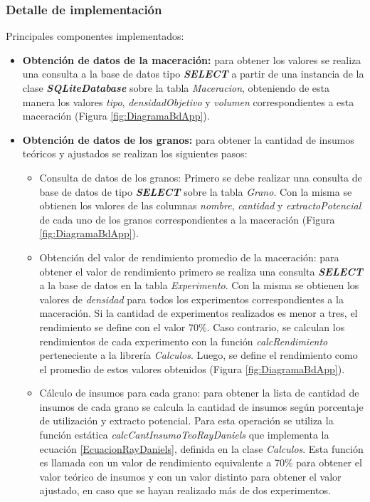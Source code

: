             \subsubsection{Detalle de implementación}
            \par Principales componentes implementados:
            \begin{itemize}
                \item \textbf{Obtención de datos de la maceración:} para obtener los valores se realiza una consulta a la base de datos tipo \textbf{ \textit{\gls{SELECT}}} a partir de una instancia de la clase \textbf{\textit{\gls{SQLiteDatabase}}} sobre la tabla \textit{Maceracion}, obteniendo de esta manera los valores \textit{tipo}, \textit{densidadObjetivo} y \textit{volumen} correspondientes a esta maceración (Figura \ref{fig:DiagramaBdApp}). 
                
                \item \textbf{Obtención de datos de los granos:} 
                    para obtener la cantidad de insumos teóricos y ajustados se realizan los siguientes pasos:
                    \begin{itemize}
                        \item Consulta de datos de los granos: Primero se debe realizar una consulta de base de datos de tipo \textbf{\textit{\gls{SELECT}}} sobre la tabla \textit{Grano}. Con la misma se obtienen los valores de las columnas \textit{nombre}, \textit{cantidad} y \textit{extractoPotencial} de cada uno de los granos correspondientes a la maceración (Figura \ref{fig:DiagramaBdApp}).
                        
                        \item Obtención del valor de rendimiento promedio de la maceración: para obtener el valor de rendimiento primero se realiza una consulta \textbf{\textit{\gls{SELECT}}} a la base de datos en la tabla \textit{Experimento}. Con la misma se obtienen los valores de \textit{densidad} para todos los experimentos correspondientes a la maceración. Si la cantidad de experimentos realizados es menor a tres, el rendimiento se define con el valor 70\%. Caso contrario, se calculan los rendimientos de cada experimento con la función \textit{calcRendimiento} perteneciente a la librería \textit{Calculos}. Luego, se define el rendimiento como el promedio de estos valores obtenidos (Figura \ref{fig:DiagramaBdApp}).
                        
                        \item Cálculo de insumos para cada grano: para obtener la lista de cantidad de insumos de cada grano se calcula la cantidad de insumos según porcentaje de utilización y extracto potencial. Para esta operación se utiliza la función estática \textit{calcCantInsumoTeoRayDaniels} que implementa la ecuación \ref{EcuacionRayDaniels}, definida en la clase \textit{Calculos}. Esta función es llamada con un valor de rendimiento equivalente a 70\% para obtener el valor teórico de insumos y con un valor distinto para obtener el valor ajustado, en caso que se hayan realizado más de dos experimentos.
                        

\end{itemize}
\end{itemize}
